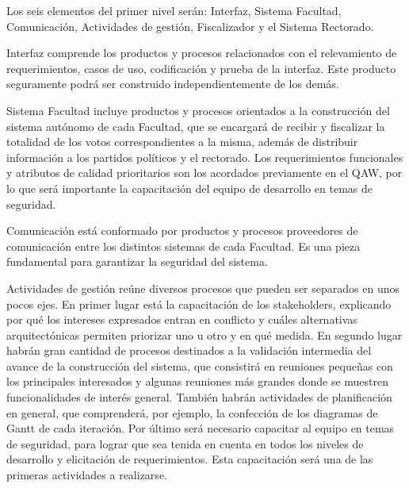 Los seis elementos del primer nivel serán: Interfaz, Sistema Facultad, Comunicación, Actividades de gestión, Fiscalizador y el Sistema Rectorado.
\\ \par
Interfaz comprende los productos y procesos relacionados con el relevamiento de requerimientos, casos de uso, codificación y prueba de la interfaz. Este producto seguramente podrá ser construido independientemente de los demás.
\\ \par
Sistema Facultad incluye productos y procesos orientados a la construcción del sistema autónomo de cada Facultad, que se encargará de recibir y fiscalizar la totalidad de los votos correspondientes a la misma, además de distribuir información a los partidos políticos y el rectorado. Los requerimientos funcionales y atributos de calidad prioritarios son los acordados previamente en el QAW, por lo que será importante la capacitación del equipo de desarrollo en temas de seguridad.
\\ \par
Comunicación está conformado por productos y procesos proveedores de comunicación entre los distintos sistemas de cada Facultad. Es una pieza fundamental para garantizar la seguridad del sistema. 
\\ \par
Actividades de gestión reúne diversos procesos que pueden ser separados en unos pocos ejes. En primer lugar está la capacitación de los stakeholders, explicando por qué los intereses expresados entran en conflicto y cuáles alternativas arquitectónicas permiten priorizar uno u otro y en qué medida.
En segundo lugar habrán gran cantidad de procesos destinados a la validación intermedia del avance de la construcción del sistema, que consistirá en reuniones pequeñas con los principales interesados y algunas reuniones más grandes donde se muestren funcionalidades de interés general.
También habrán actividades de planificación en general, que comprenderá, por ejemplo, la confección de los diagramas de Gantt de cada iteración.
Por último será necesario capacitar al equipo en temas de seguridad, para lograr que sea tenida en cuenta en todos los niveles de desarrollo y elicitación de requerimientos. Esta capacitación será una de las primeras actividades a realizarse.
\\ \par
